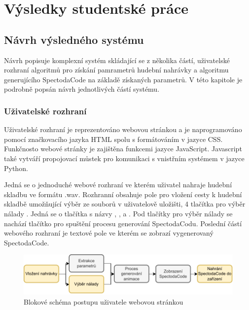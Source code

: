 \chapter{Výsledky studentské práce}


\section{Návrh výsledného systému}

Návrh popisuje komplexní systém skládající se z několika částí, uživatelské rozhraní algoritmů pro získání pamrametrů hudební nahrávky a algoritmu generujícího SpectodaCode na základě získaných parametrů. V této kapitole je podrobně popsán návrh jednotlivých částí systému. 

\subsection{Uživatelské rozhraní}

Uživatelské rozhraní je reprezentováno webovou stránkou a je naprogramováno pomocí značkovacího jazyka \acs{HTML} spolu s formátováním v jazyce CSS. Funkčnosto webové stránky je zajištěna funkcemi jazyce JavaScript. Javascript také vytváří propojovací můstek pro komunikaci s vnistřním systémem v jazyce Python.

Jedná se o jednoduché webové rozhraní ve kterém uživatel nahraje hudební skladbu ve formátu .wav. Rozhranní obsahuje pole pro vložení cesty k hudební skladbě umožňující výběr ze souborů v uživatelově uložišti, 4 tlačítka pro výběr nálady
. Jedná se o tlačítka s názvy , ,  a . Pod tlačítky pro výběr nálady se nachází tlačítko pro spuštění procesu generování SpectodaCodu.
 Poslední částí webového rozhraní je textové pole ve kterém se zobrazí vygenerovaný SpectodaCode.

 \begin{figure}[H]
    \centering
    \includegraphics[width = 1\linewidth]{obrazky/User_interaction_diagram.pdf}
    \caption{Blokové schéma postupu uživatele webovou stránkou}
    \label{fig:User_interaction_diagram}
\end{figure}

